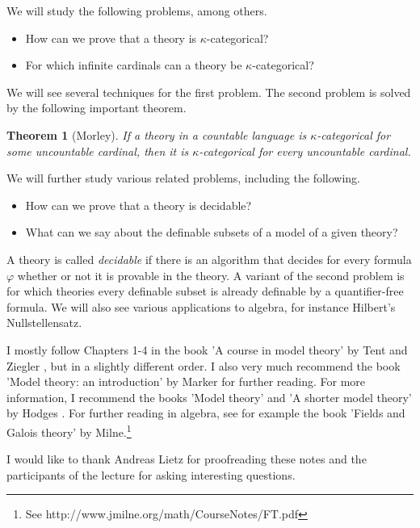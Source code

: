 \documentclass[10pt]{amsart}
\newtheorem*{theorem*}{Theorem}
\theoremstyle{definition}
\theoremstyle{remark}
\begin{document}
We will study the following problems, among others. 

\begin{itemize} 
\item 
How can we prove that a theory is $\kappa$-categorical? 
\item 
For which infinite cardinals can a theory be $\kappa$-categorical? 
\end{itemize} 

We will see several techniques for the first problem. 
The second problem is solved by the following important theorem. 

\begin{theorem*} [Morley] 
If a theory in a countable language is $\kappa$-categorical for some uncountable cardinal, then it is $\kappa$-categorical for every uncountable cardinal. 
\end{theorem*} 

We will further study various related problems, including the following.  
\begin{itemize} 
\item 
How can we prove that a theory is decidable? 
\item 
What can we say about the definable subsets of a model of a given theory? 
\end{itemize} 

A theory is called \emph{decidable} if there is an algorithm that decides for every formula $\varphi$ whether or not it is provable in the theory. A variant of the second problem is for which theories every definable subset is already definable by a quantifier-free formula. We will also see various applications to algebra, for instance Hilbert's Nullstellensatz. 

I mostly follow Chapters 1-4 in the book 'A course in model theory' by Tent and Ziegler \cite{MR2908005}, but in a slightly different order. I also very much recommend the book 'Model theory: an introduction' by Marker \cite{MR1924282} for further reading. For more information, I recommend the books 'Model theory' and 'A shorter model theory' by Hodges \cite{MR1221741, MR1462612}. For further reading in algebra, see for example the book 'Fields and Galois theory' by Milne.\footnote{See http://www.jmilne.org/math/CourseNotes/FT.pdf} 

I would like to thank Andreas Lietz for proofreading these notes and the participants of the lecture for asking interesting questions. 
\end{document}
